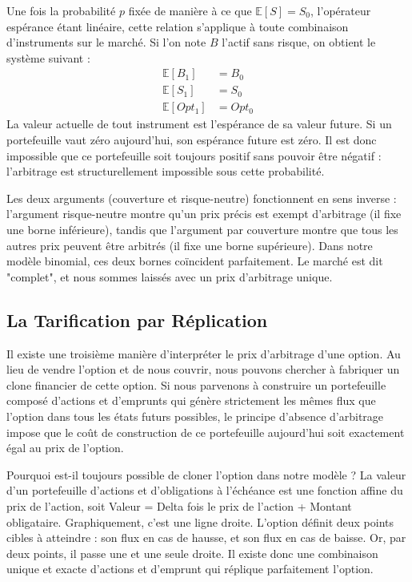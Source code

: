 \begin{theorembox}
Une fois la probabilité $p$ fixée de manière à ce que $\mathbb{E}[S] = S_0$, l'opérateur espérance étant linéaire, cette relation s'applique à toute combinaison d'instruments sur le marché.
Si l'on note $B$ l'actif sans risque, on obtient le système suivant :
\begin{align*}
    \mathbb{E}[B_1] &= B_0 \\
    \mathbb{E}[S_1] &= S_0 \\
    \mathbb{E}[Opt_1] &= Opt_0
\end{align*}
La valeur actuelle de tout instrument est l'espérance de sa valeur future. Si un portefeuille vaut zéro aujourd'hui, son espérance future est zéro. Il est donc impossible que ce portefeuille soit toujours positif sans pouvoir être négatif : l'arbitrage est structurellement impossible sous cette probabilité.
\end{theorembox}

Les deux arguments (couverture et risque-neutre) fonctionnent en sens inverse : l'argument risque-neutre montre qu'un prix précis est exempt d'arbitrage (il fixe une borne inférieure), tandis que l'argument par couverture montre que tous les autres prix peuvent être arbitrés (il fixe une borne supérieure). Dans notre modèle binomial, ces deux bornes coïncident parfaitement. Le marché est dit "complet", et nous sommes laissés avec un prix d'arbitrage unique.

\subsection{La Tarification par Réplication}

Il existe une troisième manière d'interpréter le prix d'arbitrage d'une option. Au lieu de vendre l'option et de nous couvrir, nous pouvons chercher à fabriquer un clone financier de cette option.
Si nous parvenons à construire un portefeuille composé d'actions et d'emprunts qui génère strictement les mêmes flux que l'option dans tous les états futurs possibles, le principe d'absence d'arbitrage impose que le coût de construction de ce portefeuille aujourd'hui soit exactement égal au prix de l'option.

Pourquoi est-il toujours possible de cloner l'option dans notre modèle ? 
La valeur d'un portefeuille d'actions et d'obligations à l'échéance est une fonction affine du prix de l'action, soit Valeur = Delta fois le prix de l'action + Montant obligataire. Graphiquement, c'est une ligne droite.
L'option définit deux points cibles à atteindre : son flux en cas de hausse, et son flux en cas de baisse. Or, par deux points, il passe une et une seule droite. Il existe donc une combinaison unique et exacte d'actions et d'emprunt qui réplique parfaitement l'option.

